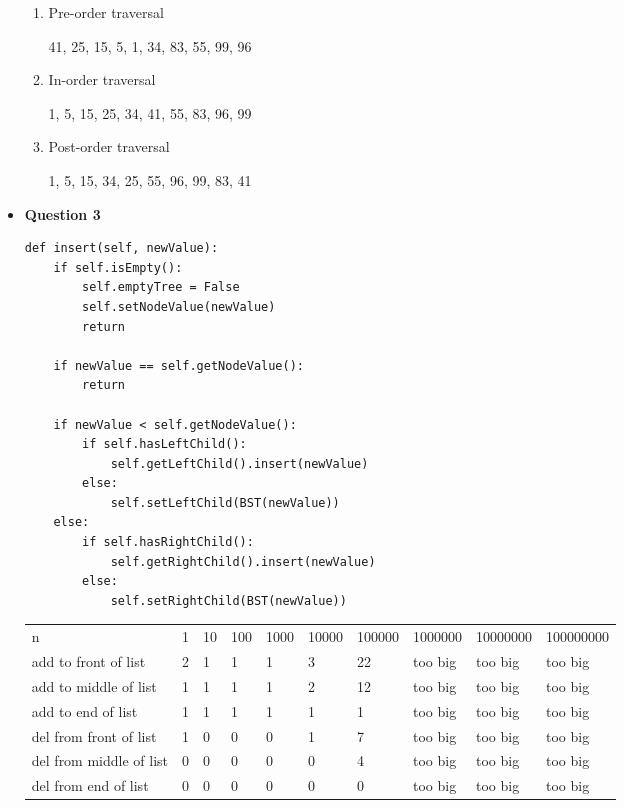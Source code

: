 \documentclass{article}
\begin{document}
\begin{itemize}
\begin{enumerate}
        \item Pre-order traversal

        41, 25, 15, 5, 1, 34, 83, 55, 99, 96

        \item In-order traversal

        1, 5, 15, 25, 34, 41, 55, 83, 96, 99

        \item Post-order traversal

        1, 5, 15, 34, 25, 55, 96, 99, 83, 41

        \end{enumerate}

    \item\textbf{ Question 3}

    \begin{lstlisting}
def insert(self, newValue):
    if self.isEmpty():
        self.emptyTree = False
        self.setNodeValue(newValue)
        return

    if newValue == self.getNodeValue():
        return

    if newValue < self.getNodeValue():
        if self.hasLeftChild():
            self.getLeftChild().insert(newValue)
        else:
            self.setLeftChild(BST(newValue))
    else:
        if self.hasRightChild():
            self.getRightChild().insert(newValue)
        else:
            self.setRightChild(BST(newValue))

    \end{lstlisting}
    \pagebreak
    \begin{table}[]
        \begin{tabular}{llllllllll}
            n                       & 1 & 10 & 100 & 1000 & 10000 & 100000 & 1000000 & 10000000 & 100000000 \\
            add to front of list    & 2 & 1  & 1   & 1    & 3     & 22     & too big & too big  & too big   \\
            add to middle of list   & 1 & 1  & 1   & 1    & 2     & 12     & too big & too big  & too big   \\
            add to end of list      & 1 & 1  & 1   & 1    & 1     & 1      & too big & too big  & too big   \\
            del from front of list  & 1 & 0  & 0   & 0    & 1     & 7      & too big & too big  & too big   \\
            del from middle of list & 0 & 0  & 0   & 0    & 0     & 4      & too big & too big  & too big   \\
            del from end of list    & 0 & 0  & 0   & 0    & 0     & 0      & too big & too big  & too big  
        \end{tabular}
    \end{table}


\end{itemize}
\end{document}
